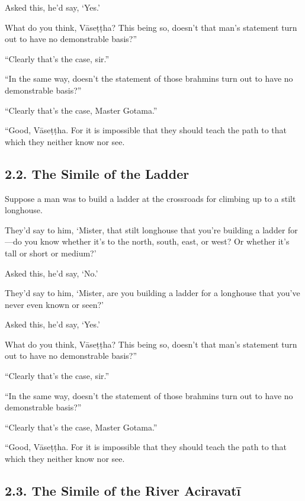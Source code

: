 \documentclass[12pt,openany]{book}%
\begin{document}
Asked this, he’d say, ‘Yes.’ 

What do you think, \textsanskrit{Vāseṭṭha}? This being so, doesn’t that man’s statement turn out to have no demonstrable basis?” 

“Clearly that’s the case, sir.” 

“In the same way, doesn’t the statement of those brahmins turn out to have no demonstrable basis?” 

“Clearly that’s the case, Master Gotama.” 

“Good, \textsanskrit{Vāseṭṭha}. For it is impossible that they should teach the path to that which they neither know nor see. 

\subsection*{2.2. The Simile of the Ladder }

Suppose a man was to build a ladder at the crossroads for climbing up to a stilt longhouse. 

They’d say to him, ‘Mister, that stilt longhouse that you’re building a ladder for—do you know whether it’s to the north, south, east, or west? Or whether it’s tall or short or medium?’ 

Asked this, he’d say, ‘No.’ 

They’d say to him, ‘Mister, are you building a ladder for a longhouse that you’ve never even known or seen?’ 

Asked this, he’d say, ‘Yes.’ 

What do you think, \textsanskrit{Vāseṭṭha}? This being so, doesn’t that man’s statement turn out to have no demonstrable basis?” 

“Clearly that’s the case, sir.” 

“In the same way, doesn’t the statement of those brahmins turn out to have no demonstrable basis?” 

“Clearly that’s the case, Master Gotama.” 

“Good, \textsanskrit{Vāseṭṭha}. For it is impossible that they should teach the path to that which they neither know nor see. 

\subsection*{2.3. The Simile of the River \textsanskrit{Aciravatī} }
\end{document}
